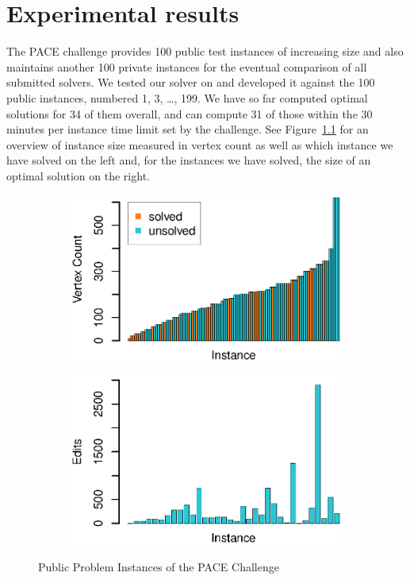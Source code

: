 \documentclass[12pt,oneside,english,parskip=full,headings=small]{scrbook}
\newcommand{\todo}[1]{\paragraph{TODO} #1}
\theoremstyle{definition}
\begin{document}

\chapter{Experimental results}
\label{sec:experimental results}

The PACE challenge provides 100 public test instances of increasing size and also maintains another
100 private instances for the eventual comparison of all submitted solvers. We tested our solver on
and developed it against the 100 public instances, numbered 1, 3, \dots, 199. We have so far
computed optimal solutions for 34 of them overall, and can compute 31 of those within the 30 minutes
per instance time limit set by the challenge. See Figure~\ref{fig:instances} for an overview of
instance size measured in vertex count as well as which instance we have solved on the left and, for
the instances we have solved, the size of an optimal solution on the right.

\begin{figure}[h]
	\begin{subfigure}{0.49\textwidth}
		\includegraphics[width=1.0\linewidth]{instances}
	\end{subfigure}
	\begin{subfigure}{0.49\textwidth}
		\includegraphics[width=1.0\linewidth]{solution_sizes}
	\end{subfigure}

	\caption{Public Problem Instances of the PACE Challenge}
	\label{fig:instances}
\end{figure}
\end{document}
